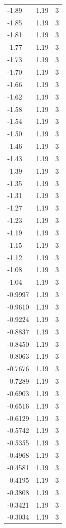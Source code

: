 \begin{longtable}{lrr}
  -1.89 & 1.19 & 3 \\
  -1.85 & 1.19 & 3 \\
  -1.81 & 1.19 & 3 \\
  -1.77 & 1.19 & 3 \\
  -1.73 & 1.19 & 3 \\
  -1.70 & 1.19 & 3 \\
  -1.66 & 1.19 & 3 \\
  -1.62 & 1.19 & 3 \\
  -1.58 & 1.19 & 3 \\
  -1.54 & 1.19 & 3 \\
  -1.50 & 1.19 & 3 \\
  -1.46 & 1.19 & 3 \\
  -1.43 & 1.19 & 3 \\
  -1.39 & 1.19 & 3 \\
  -1.35 & 1.19 & 3 \\
  -1.31 & 1.19 & 3 \\
  -1.27 & 1.19 & 3 \\
  -1.23 & 1.19 & 3 \\
  -1.19 & 1.19 & 3 \\
  -1.15 & 1.19 & 3 \\
  -1.12 & 1.19 & 3 \\
  -1.08 & 1.19 & 3 \\
  -1.04 & 1.19 & 3 \\
  -0.9997 & 1.19 & 3 \\
  -0.9610 & 1.19 & 3 \\
  -0.9224 & 1.19 & 3 \\
  -0.8837 & 1.19 & 3 \\
  -0.8450 & 1.19 & 3 \\
  -0.8063 & 1.19 & 3 \\
  -0.7676 & 1.19 & 3 \\
  -0.7289 & 1.19 & 3 \\
  -0.6903 & 1.19 & 3 \\
  -0.6516 & 1.19 & 3 \\
  -0.6129 & 1.19 & 3 \\
  -0.5742 & 1.19 & 3 \\
  -0.5355 & 1.19 & 3 \\
  -0.4968 & 1.19 & 3 \\
  -0.4581 & 1.19 & 3 \\
  -0.4195 & 1.19 & 3 \\
  -0.3808 & 1.19 & 3 \\
  -0.3421 & 1.19 & 3 \\
  -0.3034 & 1.19 & 3 \\

\end{longtable}
